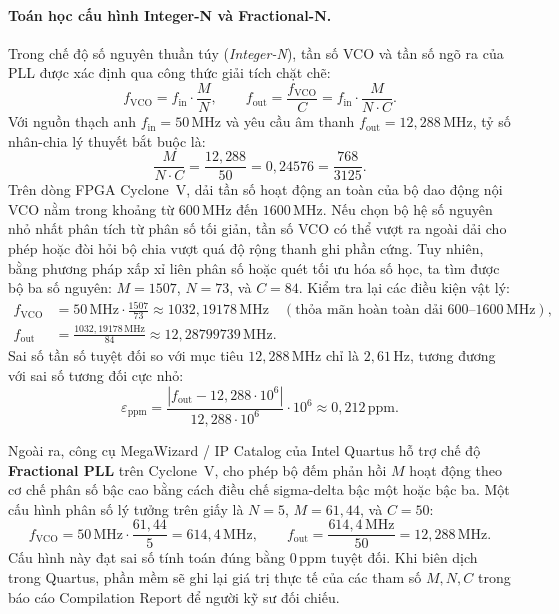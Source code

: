 \paragraph{Toán học cấu hình Integer-N và Fractional-N.}
Trong chế độ số nguyên thuần túy (\emph{Integer-N}), tần số VCO và tần số ngõ ra của PLL được xác định qua công thức giải tích chặt chẽ:
\begin{equation}
f_{\mathrm{VCO}} = f_{\mathrm{in}}\cdot\frac{M}{N},\qquad
f_{\mathrm{out}} = \frac{f_{\mathrm{VCO}}}{C} = f_{\mathrm{in}}\cdot\frac{M}{N\cdot C}.
\end{equation}
Với nguồn thạch anh $f_{\mathrm{in}} = 50\,\text{MHz}$ và yêu cầu âm thanh $f_{\mathrm{out}} = 12{,}288\,\text{MHz}$, tỷ số nhân-chia lý thuyết bắt buộc là:
\begin{equation}
\frac{M}{N\cdot C} = \frac{12{,}288}{50} = 0{,}24576 = \frac{768}{3125}.
\end{equation}
Trên dòng FPGA Cyclone~V, dải tần số hoạt động an toàn của bộ dao động nội VCO nằm trong khoảng từ $600\,\text{MHz}$ đến $1600\,\text{MHz}$. Nếu chọn bộ hệ số nguyên nhỏ nhất phân tích từ phân số tối giản, tần số VCO có thể vượt ra ngoài dải cho phép hoặc đòi hỏi bộ chia vượt quá độ rộng thanh ghi phần cứng. Tuy nhiên, bằng phương pháp xấp xỉ liên phân số hoặc quét tối ưu hóa số học, ta tìm được bộ ba số nguyên: $M = 1507$, $N = 73$, và $C = 84$. Kiểm tra lại các điều kiện vật lý:
\begin{align}
f_{\mathrm{VCO}} &= 50\,\text{MHz}\cdot\frac{1507}{73} \approx 1032{,}19178\,\text{MHz} \quad (\text{thỏa mãn hoàn toàn dải } 600\text{--}1600\,\text{MHz}),\\
f_{\mathrm{out}} &= \frac{1032{,}19178\,\text{MHz}}{84} \approx 12{,}28799739\,\text{MHz}.
\end{align}
Sai số tần số tuyệt đối so với mục tiêu $12{,}288\,\text{MHz}$ chỉ là $2{,}61\,\text{Hz}$, tương đương với sai số tương đối cực nhỏ:
\begin{equation}
\varepsilon_{\mathrm{ppm}} = \frac{|f_{\mathrm{out}} - 12{,}288\cdot 10^6|}{12{,}288\cdot 10^6}\cdot 10^{6} \approx 0{,}212\,\text{ppm}.
\end{equation}

Ngoài ra, công cụ MegaWizard / IP Catalog của Intel Quartus hỗ trợ chế độ \textbf{Fractional PLL} trên Cyclone~V, cho phép bộ đếm phản hồi $M$ hoạt động theo cơ chế phân số bậc cao bằng cách điều chế sigma-delta bậc một hoặc bậc ba. Một cấu hình phân số lý tưởng trên giấy là $N = 5$, $M = 61{,}44$, và $C = 50$:
\begin{equation}
f_{\mathrm{VCO}} = 50\,\text{MHz}\cdot\frac{61{,}44}{5} = 614{,}4\,\text{MHz},\qquad
f_{\mathrm{out}} = \frac{614{,}4\,\text{MHz}}{50} = 12{,}288\,\text{MHz}.
\end{equation}
Cấu hình này đạt sai số tính toán đúng bằng $0\,\text{ppm}$ tuyệt đối. Khi biên dịch trong Quartus, phần mềm sẽ ghi lại giá trị thực tế của các tham số $M, N, C$ trong báo cáo Compilation Report để người kỹ sư đối chiếu.

